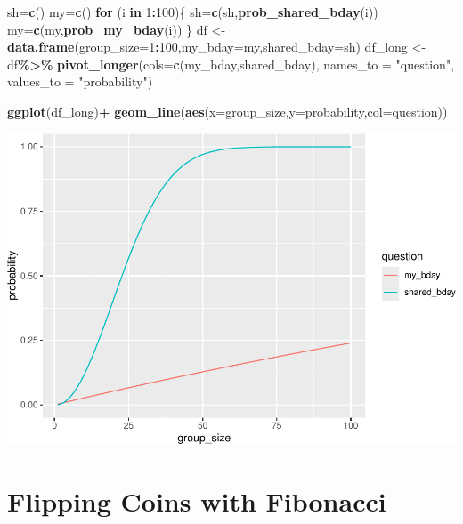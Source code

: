 \documentclass[
]{book}
\newenvironment{Shaded}{\begin{snugshade}}{\end{snugshade}}
\newcommand{\AttributeTok}[1]{\textcolor[rgb]{0.13,0.29,0.53}{#1}}
\newcommand{\ControlFlowTok}[1]{\textcolor[rgb]{0.13,0.29,0.53}{\textbf{#1}}}
\newcommand{\DecValTok}[1]{\textcolor[rgb]{0.00,0.00,0.81}{#1}}
\newcommand{\FunctionTok}[1]{\textcolor[rgb]{0.13,0.29,0.53}{\textbf{#1}}}
\newcommand{\NormalTok}[1]{#1}
\newcommand{\OtherTok}[1]{\textcolor[rgb]{0.56,0.35,0.01}{#1}}
\newcommand{\SpecialCharTok}[1]{\textcolor[rgb]{0.81,0.36,0.00}{\textbf{#1}}}
\newcommand{\StringTok}[1]{\textcolor[rgb]{0.31,0.60,0.02}{#1}}
\theoremstyle{definition}
\theoremstyle{definition}
\theoremstyle{definition}
\theoremstyle{definition}
\theoremstyle{remark}
\begin{document}
\begin{Shaded}
\begin{Highlighting}[]
\NormalTok{sh}\OtherTok{=}\FunctionTok{c}\NormalTok{()}
\NormalTok{my}\OtherTok{=}\FunctionTok{c}\NormalTok{()}
\ControlFlowTok{for}\NormalTok{ (i }\ControlFlowTok{in} \DecValTok{1}\SpecialCharTok{:}\DecValTok{100}\NormalTok{)\{}
\NormalTok{  sh}\OtherTok{=}\FunctionTok{c}\NormalTok{(sh,}\FunctionTok{prob\_shared\_bday}\NormalTok{(i))}
\NormalTok{  my}\OtherTok{=}\FunctionTok{c}\NormalTok{(my,}\FunctionTok{prob\_my\_bday}\NormalTok{(i))}
\NormalTok{\}}
\NormalTok{df }\OtherTok{\textless{}{-}} \FunctionTok{data.frame}\NormalTok{(}\AttributeTok{group\_size=}\DecValTok{1}\SpecialCharTok{:}\DecValTok{100}\NormalTok{,}\AttributeTok{my\_bday=}\NormalTok{my,}\AttributeTok{shared\_bday=}\NormalTok{sh)}
\NormalTok{df\_long }\OtherTok{\textless{}{-}}\NormalTok{ df}\SpecialCharTok{\%\textgreater{}\%} \FunctionTok{pivot\_longer}\NormalTok{(}\AttributeTok{cols=}\FunctionTok{c}\NormalTok{(my\_bday,shared\_bday), }\AttributeTok{names\_to =} \StringTok{"question"}\NormalTok{, }\AttributeTok{values\_to =} \StringTok{"probability"}\NormalTok{)}

\FunctionTok{ggplot}\NormalTok{(df\_long)}\SpecialCharTok{+}
  \FunctionTok{geom\_line}\NormalTok{(}\FunctionTok{aes}\NormalTok{(}\AttributeTok{x=}\NormalTok{group\_size,}\AttributeTok{y=}\NormalTok{probability,}\AttributeTok{col=}\NormalTok{question))}
\end{Highlighting}
\end{Shaded}

\includegraphics{math340-notes_files/figure-latex/unnamed-chunk-131-1.pdf}

\section{Flipping Coins with Fibonacci}\label{flipping-coins-with-fibonacci}
\end{document}
